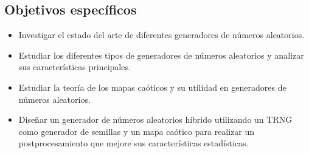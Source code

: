 		\subsection{Objetivos específicos}
			\begin{itemize}
                \item Investigar el estado del arte de diferentes generadores de números aleatorios.
                \item Estudiar los diferentes tipos de generadores de números aleatorios y analizar sus características principales.
                \item Estudiar la teoría de los mapas caóticos y su utilidad en generadores de números aleatorios.
                \item Diseñar un generador de números aleatorios híbrido utilizando un TRNG como generador de semillas y un mapa caótico para realizar un postprocesamiento que mejore sus características estadísticas.
			\end{itemize}
